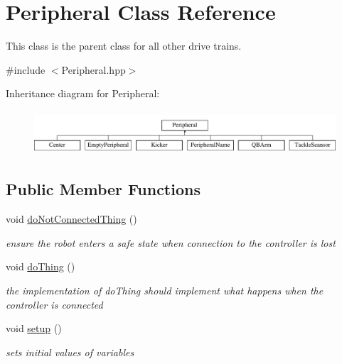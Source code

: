 \hypertarget{class_peripheral}{}\section{Peripheral Class Reference}
\label{class_peripheral}


This class is the parent class for all other drive trains.  




{\ttfamily \#include $<$Peripheral.\+hpp$>$}

Inheritance diagram for Peripheral\+:\begin{figure}[H]
\begin{center}
\leavevmode
\includegraphics[height=1.651917cm]{class_peripheral}
\end{center}
\end{figure}
\subsection*{Public Member Functions}
\begin{DoxyCompactItemize}
\item 
\mbox{\label{class_peripheral_adc231eaa2fec43878c139af159503727}} 
void \mbox{\hyperlink{class_peripheral_adc231eaa2fec43878c139af159503727}{do\+Not\+Connected\+Thing}} ()
\begin{DoxyCompactList}\small\item\em ensure the robot enters a safe state when connection to the controller is lost \end{DoxyCompactList}\item 
\mbox{\label{class_peripheral_a5baf1180b80d1a61192542c29ae1d650}} 
void \mbox{\hyperlink{class_peripheral_a5baf1180b80d1a61192542c29ae1d650}{do\+Thing}} ()
\begin{DoxyCompactList}\small\item\em the implementation of do\+Thing should implement what happens when the controller is connected \end{DoxyCompactList}\item 
\mbox{\label{class_peripheral_a3571b35c82ab213985cb1693be08904b}} 
void \mbox{\hyperlink{class_peripheral_a3571b35c82ab213985cb1693be08904b}{setup}} ()
\begin{DoxyCompactList}\small\item\em sets initial values of variables \end{DoxyCompactList}\end{DoxyCompactItemize}


